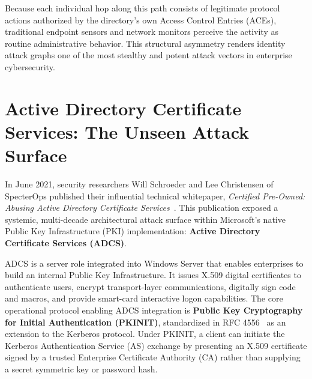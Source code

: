 Because each individual hop along this path consists of legitimate protocol actions authorized by the directory's own Access Control Entries (ACEs), traditional endpoint sensors and network monitors perceive the activity as routine administrative behavior. This structural asymmetry renders identity attack graphs one of the most stealthy and potent attack vectors in enterprise cybersecurity.

\section{Active Directory Certificate Services: The Unseen Attack Surface}
In June 2021, security researchers Will Schroeder and Lee Christensen of SpecterOps published their influential technical whitepaper, \textit{Certified Pre-Owned: Abusing Active Directory Certificate Services}~\cite{schroeder2021certified}. This publication exposed a systemic, multi-decade architectural attack surface within Microsoft's native Public Key Infrastructure (PKI) implementation: \textbf{Active Directory Certificate Services (ADCS)}.

ADCS is a server role integrated into Windows Server that enables enterprises to build an internal Public Key Infrastructure. It issues X.509 digital certificates to authenticate users, encrypt transport-layer communications, digitally sign code and macros, and provide smart-card interactive logon capabilities. The core operational protocol enabling ADCS integration is \textbf{Public Key Cryptography for Initial Authentication (PKINIT)}, standardized in RFC 4556~\cite{rfc4556} as an extension to the Kerberos protocol. Under PKINIT, a client can initiate the Kerberos Authentication Service (AS) exchange by presenting an X.509 certificate signed by a trusted Enterprise Certificate Authority (CA) rather than supplying a secret symmetric key or password hash.

